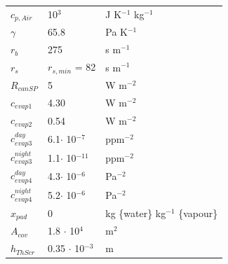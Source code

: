 \documentclass[a4paper]{article}
\begin{document}
\begin{longtable}{l p{} l }
$c_{p,Air}$					& 10$^3$				& J K$^{-1}$ kg$^{-1}$              \\
$\gamma$					& 65.8					& Pa K$^{-1}$                       \\
$r_b$						& 275					& s m$^{-1}$                        \\
$r_s$						& $r_{s,min}$ = 82		& s m$^{-1}$                        \\ 
$R_{can SP}$                & 5                     & W m$^{-2}$\\
$c_{evap1}$                 & 4.30                  & W m$^{-2}$\\
$c_{evap2}$                 & 0.54                  & W m$^{-2}$\\
$c^{day}_{evap3}$           & 6.1$\cdot$ 10$^{-7}$  & ppm$^{-2}$\\
$c^{night}_{evap3}$         & 1.1$\cdot$ 10$^{-11}$  & ppm$^{-2}$\\
$c^{day}_{evap4}$           & 4.3$\cdot$ 10$^{-6}$  & Pa$^{-2}$\\
$c^{night}_{evap4}$         & 5.2$\cdot$ 10$^{-6}$  & Pa$^{-2}$\\
$x_{pad}$                   & 0                     &kg \{water\} kg$^{-1}$ \{vapour\}   \\                          
$A_{cov}$                   & 1.8 $\cdot$ 10$^4$     &m$^2$                              \\
$h_{ThScr}$                 &0.35 $\cdot$ 10$^{-3}$  &m\\
\bottomrule[\heavyrulewidth]
\end{longtable}
\end{document}
